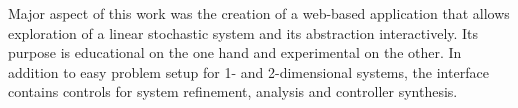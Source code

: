 Major aspect of this work was the creation of a web-based application that allows exploration of a linear stochastic system and its abstraction interactively.
Its purpose is educational on the one hand and experimental on the other.
In addition to easy problem setup for 1- and 2-dimensional systems, the interface contains controls for system refinement, analysis and controller synthesis.

